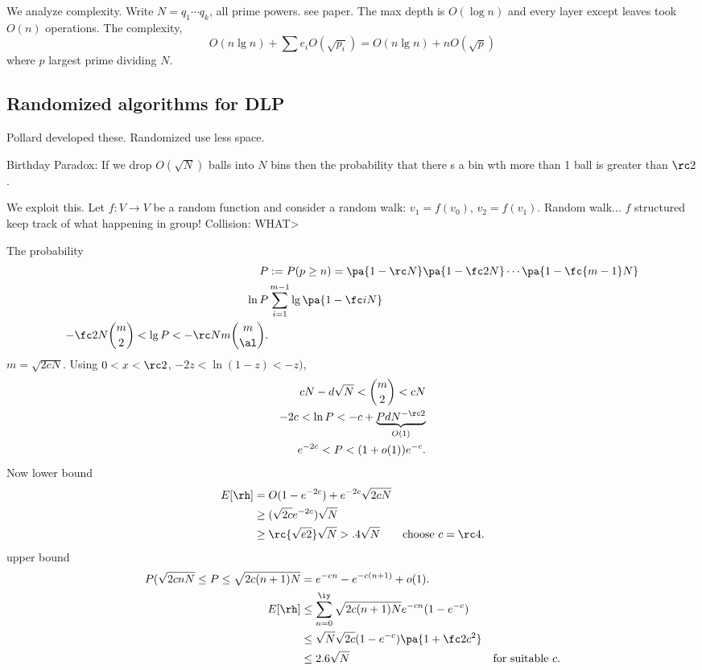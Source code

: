 We analyze complexity.
Write $N=q_1\cdots q_k$, all prime powers. see paper. The max depth is $O(\log n)$ and every layer except leaves took $O(n)$ operations. The complexity,
\[
O(n\lg n)+\sum e_i O(\sqrt{p_i})=O(n\lg n)+ nO(\sqrt p)
\]
where $p$ largest prime dividing $N$.

\subsection{Randomized algorithms for DLP}
Pollard developed these. %
Randomized use less space.

Birthday Paradox: If we drop $O(\sqrt N)$ balls into $N$ bins then the probability that there s a bin wth more than 1 ball is greater than $\rc2$.

We exploit this. Let $f:V\to V$ be a random function and consider a random walk: $v_1=f(v_0)$, $v_2=f(v_1)$. Random walk...
$f$ structured keep track of what happening in group! Collision: WHAT> 

The probability 
\begin{align*}
P&:=P(p\ge n)=\pa{1-\rc N}\pa{1-\fc2 N}\cdots \pa{1-\fc{m-1}N}\\
\ln P&\sum_{i=1}^{m-1} \lg\pa{1-\fc iN}\\
-\fc 2N \binom m2 < \lg P<-\rc N m\binom m{\al}.
\end{align*}
$m=\sqrt{2cN}$. Using $0<x< \rc2$, $-2z<\ln(1-z)<-z)$,
\begin{align*}
cN-d\sqrt N<\binom m2<cN\\
-2c<\ln P<-c+\underbrace{PdN^{-\rc 2}}_{O(1)}\\
e^{-2c}<P<(1+o(1))e^{-c}.
\end{align*}
Now lower bound
\begin{align*}
E[\rh] &= O(1-e^{-2c})+e^{-2c} \sqrt{2cN}\\
&\ge (\sqrt{2c} e^{-2c}) \sqrt N\\
&\ge \rc{\sqrt{e2}}\sqrt N>.4\sqrt{N}&\text{choose }c=\rc 4.
\end{align*}
upper bound
\begin{align*}
P(\sqrt{2cnN}\le P\le \sqrt{2c(n+1)N}&=e^{-cn}-e^{-c(n+1)}+o(1).\\
E[\rh]&\le \sum_{n=0}^{\iy} \sqrt{2c(n+1)N} e^{-cn}(1-e^{-c})\\
&\le \sqrt N\sqrt{2c} (1-e^{-c}) \pa{1+\fc2{c^2}}\\
&\le 2.6\sqrt N&\text{for suitable $c$}.
\end{align*}
